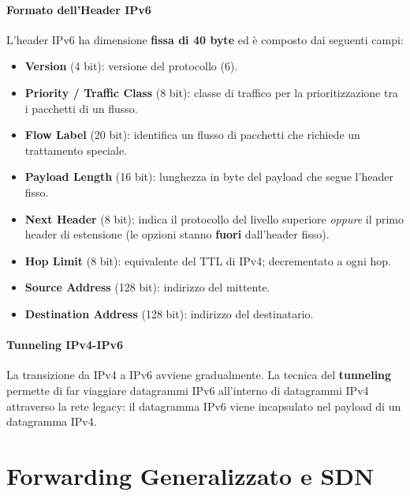 \paragraph{Formato dell'Header IPv6}
L'header IPv6 ha dimensione \textbf{fissa di 40 byte} ed è composto dai seguenti campi:
\begin{itemize}
    \item \textbf{Version} (4 bit): versione del protocollo (6).
    \item \textbf{Priority / Traffic Class} (8 bit): classe di traffico per la prioritizzazione tra i pacchetti di un flusso.
    \item \textbf{Flow Label} (20 bit): identifica un flusso di pacchetti che richiede un trattamento speciale.
    \item \textbf{Payload Length} (16 bit): lunghezza in byte del payload che segue l'header fisso.
    \item \textbf{Next Header} (8 bit): indica il protocollo del livello superiore \textit{oppure} il primo header di estensione (le opzioni stanno \textbf{fuori} dall'header fisso).
    \item \textbf{Hop Limit} (8 bit): equivalente del TTL di IPv4; decrementato a ogni hop.
    \item \textbf{Source Address} (128 bit): indirizzo del mittente.
    \item \textbf{Destination Address} (128 bit): indirizzo del destinatario.
\end{itemize}


\paragraph{Tunneling IPv4-IPv6}
La transizione da IPv4 a IPv6 avviene gradualmente. La tecnica del \textbf{tunneling} permette di far viaggiare datagrammi IPv6 all'interno di datagrammi IPv4 attraverso la rete legacy: il datagramma IPv6 viene incapsulato nel payload di un datagramma IPv4.

\section{Forwarding Generalizzato e SDN}

